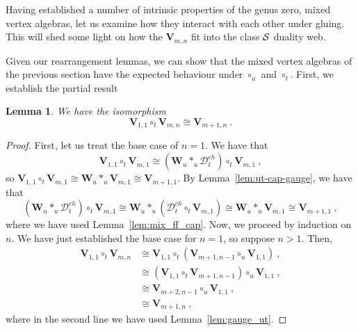 \documentclass[a4paper]{article}
\newtheorem{lem}[thm]{Lemma}
\def\SS{{\cal S}}
\def\D{\mathcal{D}^{ch}}
\def\W{\mathbf{W}}
\def\V{\mathbf{V}}
\begin{document}
Having established a number of intrinsic properties of the genus zero, mixed vertex algebras, let us examine how they interact with each other under gluing. This will shed some light on how the $\V_{m,n}$ fit into the class $\SS$ duality web.

Given our rearrangement lemmas, we can show that the mixed vertex algebras of the previous section have the expected behaviour under $\circ_u$ and $\circ_t$. First, we establish the partial result

\begin{lem}\label{lem:gauge_mix_trin}
We have the isomorphism
\begin{equation*}
	\V_{1,1}\circ_t \V_{m,n} \cong \V_{m+1,n}~.
\end{equation*}
\end{lem}
\begin{proof}
First, let us treat the base case of $n=1$. We have that
\begin{equation*}
	\V_{1,1}\circ_t \V_{m,1} \cong (\W_u \ast_u \D_t)\circ_t \V_{m,1}~,
\end{equation*}
so $\V_{1,1}\circ_t \V_{m,1} \cong \W_u\ast_u \V_{m,1} \cong \V_{m+1,1}$. By Lemma~\ref{lem:ut-cap-gauge}, we have that
\begin{equation*}
	(\W_u \ast_u \D_t)\circ_t \V_{m,1}\cong \W_u\ast_u(\D_t \circ_t \V_{m,1}) \cong \W_u \ast_u \V_{m,1}\cong \V_{m+1,1}~,
\end{equation*}
where we have used Lemma~\ref{lem:mix_ff_cap}. Now, we proceed by induction on $n$. We have just established the base case for $n=1$, so suppose $n>1$. Then,
\begin{equation}\nonumber
	\begin{split}
	\V_{1,1}\circ_t \V_{m,n} &\cong \V_{1,1}\circ_t (\V_{m+1,n-1}\circ_u \V_{1,1})~, \\
	&\cong (\V_{1,1}\circ_t \V_{m+1,n-1})\circ_u \V_{1,1} ~,\\
	&\cong \V_{m+2,n-1}\circ_u \V_{1,1}~, \\
	&\cong \V_{m+1,n}~,
	\end{split}
\end{equation}
where in the second line we have used Lemma~\ref{lem:gauge_ut}.
\end{proof}
\vspace{-6pt}
\end{document}
